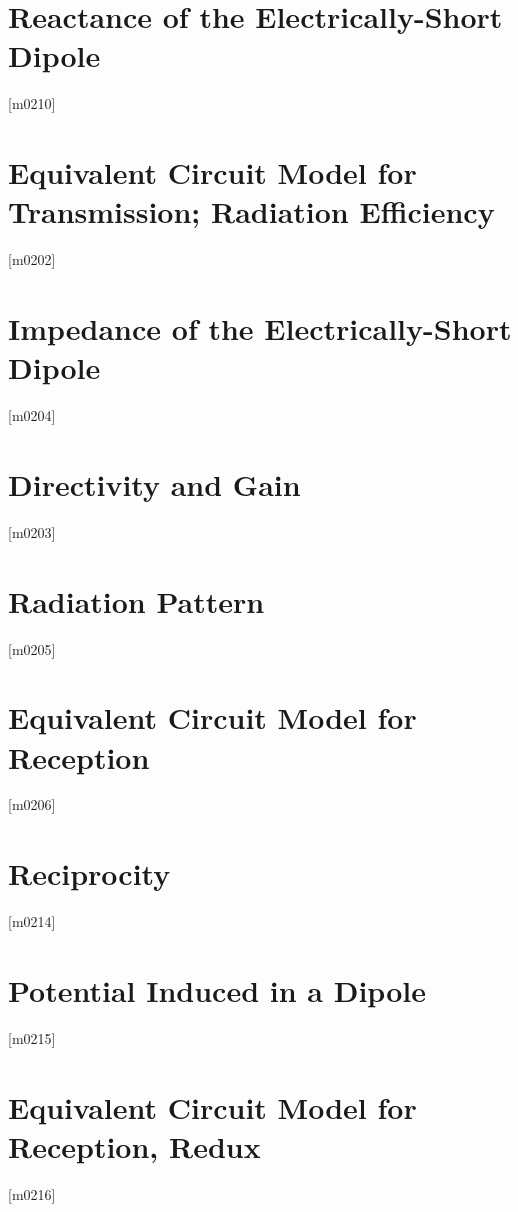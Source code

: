 \documentclass[10pt,letterpaper,twocolumn,openany]{book}
\theoremstyle{definition} %
\begin{document}
    \section{Reactance of the Electrically-Short Dipole}
{\color{blue}\tiny[m0210]}      
      \vfill\break
    \section{Equivalent Circuit Model for Transmission; Radiation Efficiency}
{\color{blue}\tiny[m0202]}      
      \vfill\break
    \section{Impedance of the Electrically-Short Dipole}
{\color{blue}\tiny[m0204]}      
      \vfill\break
    \section{Directivity and Gain}
{\color{blue}\tiny[m0203]}      
      \vfill\break
    \section{Radiation Pattern}
{\color{blue}\tiny[m0205]}      
      \vfill\break
    \section{Equivalent Circuit Model for Reception}
{\color{blue}\tiny[m0206]}      
      \vfill\break
    \section{Reciprocity}
{\color{blue}\tiny[m0214]}      
      \vfill\break
    \section{Potential Induced in a Dipole}
{\color{blue}\tiny[m0215]}      
      \vfill\break
    \section{Equivalent Circuit Model for Reception, Redux}
{\color{blue}\tiny[m0216]}      
      \vfill\break
\end{document}
